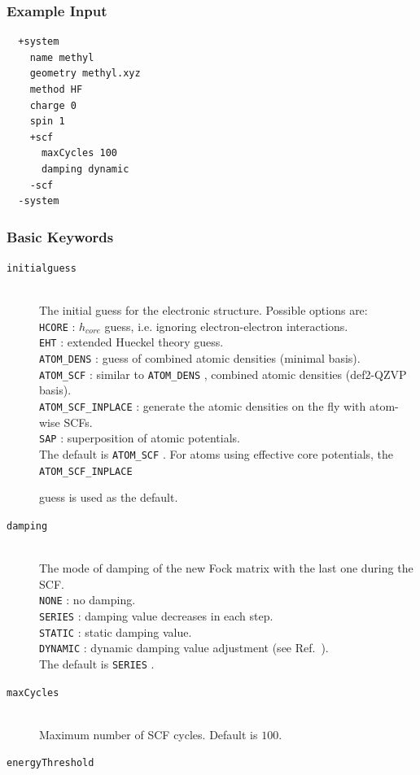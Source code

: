 \documentclass[bibliography=totocnumbered,a4paper,10pt,oneside]{scrbook}
\newcommand{\ttt}[1]{%
  \begingroup\setlength{\fboxsep}{1pt}%
  \colorbox{serenity-green!30}{\texttt{\hspace*{2pt}\vphantom{(g}#1\hspace*{2pt}}}%
  \endgroup
}
\begin{document}
\subsubsection{Example Input}
\begin{lstlisting}
  +system
    name methyl
    geometry methyl.xyz
    method HF
    charge 0
    spin 1
    +scf
      maxCycles 100
      damping dynamic
    -scf
  -system
 \end{lstlisting}
\subsubsection{Basic Keywords}
\begin{description}
 \item [\texttt{initialguess}]\hfill \\
   The initial guess for the electronic structure. Possible options are:\\
   \ttt{HCORE}: $h_{core}$ guess, i.e. ignoring electron-electron interactions.\\
   \ttt{EHT}: extended Hueckel theory guess.\\
   \ttt{ATOM\_DENS}: guess of combined atomic densities (minimal basis).\\
   \ttt{ATOM\_SCF}: similar to \ttt{ATOM\_DENS}, combined atomic densities (def2-QZVP basis).\\
   \ttt{ATOM\_SCF\_INPLACE}: generate the atomic densities on the fly with atom-wise SCFs.\\
   \ttt{SAP}: superposition of atomic potentials.\\
   The default is \ttt{ATOM\_SCF}. For atoms using effective core potentials, the \ttt{ATOM\_SCF\_INPLACE}
   guess is used as the default.
 \item [\texttt{damping}]\hfill \\
   The mode of damping of the new Fock matrix with the last one during the SCF.\\
   \ttt{NONE}: no damping.\\
   \ttt{SERIES}: damping value decreases in each step.\\
   \ttt{STATIC}: static damping value.\\
   \ttt{DYNAMIC}: dynamic damping value adjustment (see Ref.~\cite{cances2000can}).\\
   The default is \ttt{SERIES}.
   \item [\texttt{maxCycles}]\hfill \\
   Maximum number of SCF cycles. Default is $100$.
   \item [\texttt{energyThreshold}]\hfill \\

\end{description}
\end{document}
